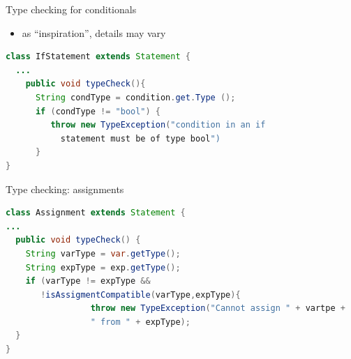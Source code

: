 \documentclass{beamer}
\begin{document}
\begin{frame}[label={sec:orge8ae659},fragile,plain]{Type checking for conditionals}
 \begin{itemize}
\item as ``inspiration'', details may vary
\end{itemize}


\begin{lstlisting}[language=java,numbers=none]
  class IfStatement extends Statement {
  ...
    public void typeCheck(){
      String condType = condition.get.Type ();
      if (condType != "bool") {  
         throw new TypeException("condition in an if 
           statement must be of type bool")
      }
}
\end{lstlisting}
\end{frame}
\begin{frame}[label={sec:orgb723957},fragile,plain]{Type checking: assignments}
 \begin{lstlisting}[language=java,numbers=none]
class Assignment extends Statement {
...
  public void typeCheck() {
    String varType = var.getType();
    String expType = exp.getType();
    if (varType != expType &&
       !isAssigmentCompatible(varType,expType){
                 throw new TypeException("Cannot assign " + vartpe + 
                 " from " + expType);
  }
}

\end{lstlisting}
\end{frame}
\end{document}
